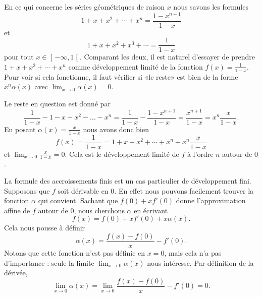 \begin{example} \label{ExTHGooCBcnAy}
    En ce qui concerne les séries géométriques de raison \( x\) nous savons les formules
    \begin{equation}
        1+x+x^2+\cdots +x^n=\frac{ 1-x^{n+1} }{ 1-x }
    \end{equation}
    et
    \begin{equation}
        1+x+x^2+x^3+\cdots=\frac{ 1 }{ 1-x }
    \end{equation}
    pour tout \( x\in\mathopen] -\infty , 1 \mathclose[\). Comparant les deux, il est naturel d'essayer de prendre \( 1+x+x^2+\cdots +x^n\) comme développement limité de la fonction \( f(x)=\frac{1}{ 1-x }\). Pour voir si cela fonctionne, il faut vérifier si «le reste» est bien de la forme \( x^n\alpha(x)\) avec \( \lim_{x\to 0} \alpha(x)=0\).

    Le reste en question est donné par
    \begin{equation}
        \frac{1}{ 1-x }-1-x-x^2-\ldots-x^n=\frac{1}{ 1-x }-\frac{ 1-x^{n+1} }{ 1-x }=\frac{ x^{n+1} }{ 1-x }=x^n\frac{ x }{ 1-x }.
    \end{equation}
    En posant \( \alpha(x)=\frac{ x }{ 1-x }\) nous avons donc bien
    \begin{equation}
        f(x)=\frac{1}{ 1-x }=1+x+x^2+\cdots +x^n+x^n\frac{ x }{ 1-x }
    \end{equation}
    et \( \lim_{x\to 0} \frac{ x }{ 1-x }=0\). Cela est le développement limité de \( f\) à l'ordre \( n\) autour de \( 0\).
\end{example}

La formule des accroissements finis est un cas particulier de développement fini. Supposons que \( f\) soit dérivable en \( 0\). En effet nous pouvons facilement trouver la fonction \( \alpha\) qui convient. Sachant que \( f(0)+xf'(0)\) donne l'approximation affine de \( f\) autour de \( 0\), nous cherchons \( \alpha\) en écrivant
\begin{equation}
    f(x)=f(0)+xf'(0)+x\alpha(x).
\end{equation}
Cela nous pousse à définir
\begin{equation}    \label{EqDCFooKozKrt}
    \alpha(x)=\frac{ f(x)-f(0) }{ x }-f'(0).
\end{equation}
Notons que cette fonction n'est pas définie en \( x=0\), mais cela n'a pas d'importance : seule la limite \( \lim_{x\to 0} \alpha(x)\) nous intéresse. Par définition de la dérivée,
\begin{equation}
    \lim_{x\to 0} \alpha(x)=\lim_{x\to 0} \frac{ f(x)-f(0) }{ x }-f'(0)=0.
\end{equation}

